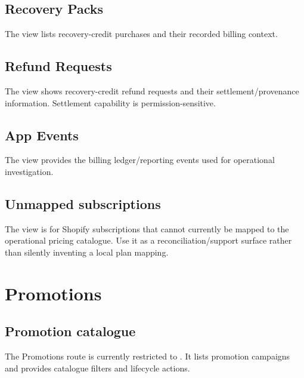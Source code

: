 \section{Recovery Packs}
The  view lists recovery-credit purchases and their recorded billing context.


\section{Refund Requests}
The  view shows recovery-credit refund requests and their settlement/provenance information. Settlement capability is permission-sensitive.


\section{App Events}
The  view provides the billing ledger/reporting events used for operational investigation.


\section{Unmapped subscriptions}
The  view is for Shopify subscriptions that cannot currently be mapped to the operational pricing catalogue. Use it as a reconciliation/support surface rather than silently inventing a local plan mapping.


\chapter{Promotions}

\section{Promotion catalogue}
The Promotions route is currently restricted to . It lists promotion campaigns and provides catalogue filters and lifecycle actions.



